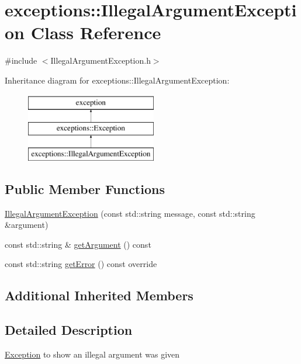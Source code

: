 \hypertarget{classexceptions_1_1IllegalArgumentException}{}\section{exceptions\+:\+:Illegal\+Argument\+Exception Class Reference}
\label{classexceptions_1_1IllegalArgumentException}


{\ttfamily \#include $<$Illegal\+Argument\+Exception.\+h$>$}

Inheritance diagram for exceptions\+:\+:Illegal\+Argument\+Exception\+:\begin{figure}[H]
\begin{center}
\leavevmode
\includegraphics[height=3.000000cm]{de/d97/classexceptions_1_1IllegalArgumentException}
\end{center}
\end{figure}
\subsection*{Public Member Functions}
\begin{DoxyCompactItemize}
\item 
\hyperlink{classexceptions_1_1IllegalArgumentException_a299c4dc8ad0df639a618ced7799001ff}{Illegal\+Argument\+Exception} (const std\+::string message, const std\+::string \&argument)
\item 
const std\+::string \& \hyperlink{classexceptions_1_1IllegalArgumentException_a9228ab515c25921dc0e5c68e54fb2104}{get\+Argument} () const
\item 
const std\+::string \hyperlink{classexceptions_1_1IllegalArgumentException_aa11433daf8612e2730a0473f402d297a}{get\+Error} () const override
\end{DoxyCompactItemize}
\subsection*{Additional Inherited Members}


\subsection{Detailed Description}
\hyperlink{classexceptions_1_1Exception}{Exception} to show an illegal argument was given 


